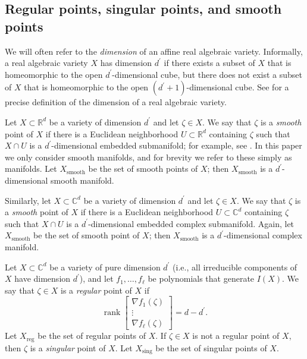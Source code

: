 \documentclass[letterpaper, reqno,11pt]{article}
\theoremstyle{remark}
\newcommand{\RR}{\mathbb{R}}
\newcommand{\CC}{\mathbb{C}}
\newcommand{\smooth}{\operatorname{smooth}}
\newcommand{\sing}{\operatorname{sing}}
\newcommand{\reg}{\operatorname{reg}}
\begin{document}
\subsection{Regular points, singular points, and smooth points}
We will often refer to the \emph{dimension} of an affine real algebraic variety. Informally, a real algebraic variety $X$ has dimension $d^\prime$ if there exists a subset of $X$ that is homeomorphic to the open $d^\prime$-dimensional cube, but there does not exist a subset of $X$ that is homeomorphic to the open $(d^\prime+1)$-dimensional cube. See \cite{BCR} for a precise definition of the dimension of a real algebraic variety.

Let $X\subset\RR^d$ be a variety of dimension $d^\prime$ and let
$\zeta\in X$. We say that $\zeta$ is a \emph{smooth} point of $X$ if
there is a Euclidean neighborhood $U\subset\RR^d$ containing $\zeta$
such that $X\cap U$ is a $d^\prime$-dimensional
embedded submanifold;
for example, see \cite[Section 3.3]{BCR}. In this paper we only consider smooth manifolds, and for brevity we refer to these simply as manifolds. Let $X_{\smooth}$ be the set of smooth points of $X$; then $X_{\smooth}$ is a $d^\prime$-dimensional smooth manifold.

Similarly, let $X\subset\CC^d$ be a variety of dimension $d^\prime$
and let $\zeta\in X$. We say that $\zeta$ is a \emph{smooth} point of
$X$ if there is a Euclidean neighborhood $U\subset\CC^{d}$ containing
$\zeta$ such that $X\cap U$ is a $d^\prime$-dimensional
embedded complex submanifold.
Again, let $X_{\smooth}$ be the set of smooth point of $X$; then $X_{\smooth}$ is a $d^\prime$-dimensional complex manifold.

Let $X\subset\CC^d$ be a variety of pure dimension $d^\prime$ (i.e., all irreducible components of $X$ have dimension $d^\prime$), and let $f_1,\ldots,f_\ell$ be polynomials that generate $I(X)$. We say that $\zeta\in X$ is a \emph{regular} point of $X$ if
\begin{equation} \label{JacobiMatrix}
\operatorname{rank}\left[\begin{array}{c}\nabla f_1(\zeta)\\ \vdots \\ \nabla f_\ell(\zeta)\end{array}\right]=d-d^\prime.
\end{equation}
Let $X_{\reg}$ be the set of regular points of $X$. If $\zeta\in X$ is not a regular point of $X$, then $\zeta$ is a \emph{singular} point of $X$. Let $X_{\sing}$ be the set of singular points of $X$.
\end{document}
